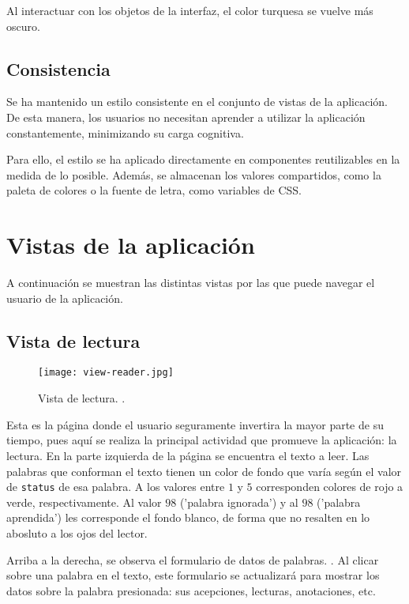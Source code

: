 Al interactuar con los objetos de la interfaz, el color turquesa se vuelve más oscuro. \todo[ventajas]

\subsection{Consistencia}

Se ha mantenido un estilo consistente en el conjunto de vistas de la aplicación. De esta manera, los usuarios no necesitan aprender a utilizar la aplicación constantemente, minimizando su carga cognitiva.

Para ello, el estilo se ha aplicado directamente en componentes reutilizables en la medida de lo posible. Además, se almacenan los valores compartidos, como la paleta de colores o la fuente de letra, como variables de CSS.

\section{Vistas de la aplicación}

A continuación se muestran las distintas vistas por las que puede navegar el usuario de la aplicación.

\subsection{Vista de lectura}

\begin{figure}[H]
	\texttt{[image: view-reader.jpg]}
	\caption[Diagrama entidad-relación]{Vista de lectura. .}
\end{figure}

Esta es la página donde el usuario seguramente invertira la mayor parte de su tiempo, pues aquí se realiza la principal actividad que promueve la aplicación: la lectura. En la parte izquierda de la página se encuentra el texto a leer. Las palabras que conforman el texto tienen un color de fondo que varía según el valor de \texttt{status} de esa palabra. A los valores entre $1$ y $5$ corresponden colores de rojo a verde, respectivamente. Al valor $98$ ('palabra ignorada') y al $98$ ('palabra aprendida') les corresponde el fondo blanco, de forma que no resalten en lo abosluto a los ojos del lector.

Arriba a la derecha, se observa el formulario de datos de palabras. . Al clicar sobre una palabra en el texto, este formulario se actualizará para mostrar los datos sobre la palabra presionada: sus acepciones, lecturas, anotaciones, etc.

